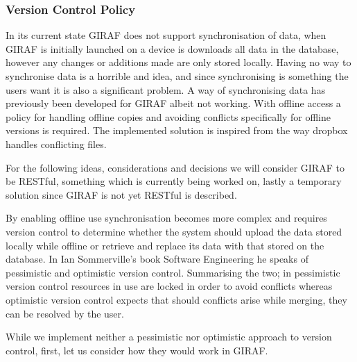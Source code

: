 \subsubsection*{Version Control Policy}
In its current state GIRAF does not support synchronisation of data, when GIRAF is initially launched on a device is downloads all data in the database, however any changes or additions made are only stored locally.
Having no way to synchronise data is a horrible and idea, and since synchronising is something the users want it is also a significant problem.
A way of synchronising data has previously been developed for GIRAF albeit not working.
With offline access a policy for handling offline copies and avoiding conflicts specifically for offline versions is required.
The implemented solution is inspired from the way dropbox handles conflicting files.

\bigskip
For the following ideas, considerations and decisions we will consider GIRAF to be RESTful, something which is currently being worked on, lastly a temporary solution since GIRAF is not yet RESTful is described.

By enabling offline use synchronisation becomes more complex and requires version control to determine whether the system should upload the data stored locally while offline or retrieve and replace its data with that stored on the database.
In Ian Sommerville's book Software Engineering \citep{SEBOOK} he speaks of pessimistic and optimistic version control.
Summarising the two; in pessimistic version control resources in use are locked in order to avoid conflicts whereas optimistic version control expects that should conflicts arise while merging, they can be resolved by the user.

\bigskip 
While we implement neither a pessimistic nor optimistic approach to version control, first, let us consider how they would work in GIRAF.

